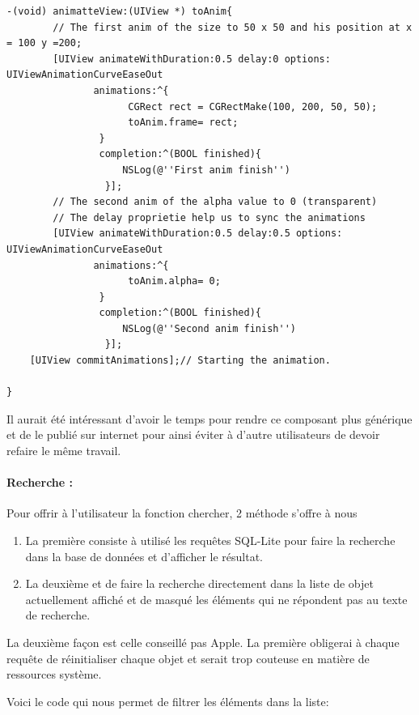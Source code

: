 \begin{lstlisting}[name=Animation UIView  , label=animateWithDuration]
-(void) animatteView:(UIView *) toAnim{
		// The first anim of the size to 50 x 50 and his position at x = 100 y =200;
        [UIView animateWithDuration:0.5 delay:0 options: UIViewAnimationCurveEaseOut
               animations:^{
                     CGRect rect = CGRectMake(100, 200, 50, 50);
                     toAnim.frame= rect;
                } 
                completion:^(BOOL finished){
					NSLog(@''First anim finish'')
                 }];
		// The second anim of the alpha value to 0 (transparent)
		// The delay proprietie help us to sync the animations
        [UIView animateWithDuration:0.5 delay:0.5 options: UIViewAnimationCurveEaseOut
               animations:^{
                     toAnim.alpha= 0;
                } 
                completion:^(BOOL finished){
					NSLog(@''Second anim finish'')
                 }];
    [UIView commitAnimations];// Starting the animation.

}
\end{lstlisting}

					Il aurait été intéressant d'avoir le temps pour rendre ce composant plus générique et de le publié sur internet pour ainsi éviter à d'autre utilisateurs de  devoir refaire le même travail.
					
					\paragraph{Recherche :}Pour offrir à l'utilisateur la fonction chercher, 2 méthode s'offre à nous
					\begin{enumerate}
					\item La première consiste à utilisé les requêtes SQL-Lite pour faire la recherche dans la base de données et d'afficher le résultat.
					\item La deuxième et de faire la recherche directement dans la liste de objet actuellement affiché et de masqué les éléments qui ne répondent pas au texte de recherche.
					\end{enumerate} 
					La deuxième façon est celle conseillé pas Apple. La première obligerai à chaque requête de réinitialiser chaque objet et serait trop couteuse en matière de ressources système. 
					
					Voici le code qui nous permet de filtrer les éléments dans la liste:
	\lstset{
			    style = Xcode,
			    caption=Methode de recherche dans une UITableView.,
			    breaklines=true,
			    frame=single
			}

